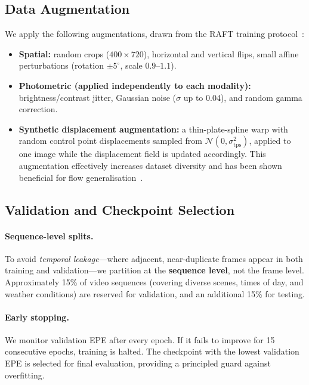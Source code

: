 \subsection{Data Augmentation}
\label{ssec:augmentation}

We apply the following augmentations, drawn from the RAFT training
protocol~\cite{teed2020raft}:
\begin{itemize}
  \item \textbf{Spatial:} random crops ($400\times720$), horizontal and
        vertical flips, small affine perturbations (rotation $\pm 5^{\circ}$,
        scale $0.9$--$1.1$).
  \item \textbf{Photometric (applied independently to each modality):}
        brightness/contrast jitter, Gaussian noise ($\sigma$ up to 0.04),
        and random gamma correction.
  \item \textbf{Synthetic displacement augmentation:} a thin-plate-spline
        warp with random control point displacements sampled from
        $\mathcal{N}(0, \sigma_{\text{tps}}^{2})$, applied to one image while
        the displacement field is updated accordingly.  This augmentation
        effectively increases dataset diversity and has been shown beneficial
        for flow generalisation~\cite{aleotti2021learning}.
\end{itemize}

\subsection{Validation and Checkpoint Selection}
\label{ssec:validation}

\paragraph{Sequence-level splits.}
To avoid \emph{temporal leakage}---where adjacent, near-duplicate frames
appear in both training and validation---we partition at the
\textbf{sequence level}, not the frame level.  Approximately 15\% of video
sequences (covering diverse scenes, times of day, and weather conditions)
are reserved for validation, and an additional 15\% for testing.

\paragraph{Early stopping.}
We monitor validation EPE after every epoch.  If it fails to improve for 15
consecutive epochs, training is halted.  The checkpoint with the lowest
validation EPE is selected for final evaluation, providing a principled
guard against overfitting.


